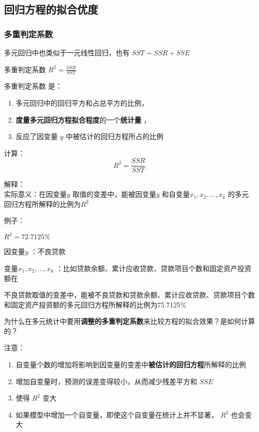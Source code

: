 \documentclass[UTF8,10pt]{book}
\begin{document}
\subsection{回归方程的拟合优度}\label{header-n171}

\subsubsection{多重判定系数 }\label{header-n172}

多元回归中也类似于一元线性回归，也有 \( SST = SSR + SSE \)

多重判定系数 \(R^2 = \frac{SSR}{SST} \)

多重判定系数 是：

\begin{enumerate}
	\def\labelenumi{\arabic{enumi}.}
	\item
	多元回归中的回归平方和占总平方的比例，
	\item
	\textbf{度量多元回归方程拟合程度}的一个\textbf{统计量} ，
	\item
	反应了因变量 \(y\) 中被估计的回归方程所占的比例
\end{enumerate}

计算：\\
\[ R^2 = \frac{SSR}{SST} \]

解释：\\
实际意义：在因变量\(y\) 取值的变差中，能被因变量\(y\)
和自变量\(x_1,x_2,...,x_k\) 的多元回归方程所解释的比例为\(R^2\)

例子：

\(R^2=72.7125\% \)

因变量\(y\) ：不良贷款

变量\(x_1,x_2,...,x_k\)
：比如贷款余额、累计应收贷款、贷款项目个数和固定资产投资额在

不良贷款取值的变差中，能被不良贷款和贷款余额、累计应收贷款、贷款项目个数和固定资产投资额的多元回归方程所解释的比例为75.7125\%

为什么在多元统计中要用\textbf{调整的多重判定系数}来比较方程的拟合效果？是如何计算的？

注意：

\begin{enumerate}
	\def\labelenumi{\arabic{enumi}.}
	\item
	自变量个数的增加将影响到因变量的变差中\textbf{被估计的回归方程}所解释的比例
	\item
	增加自变量时，预测的误差变得较小，从而减少残差平方和 \(SSE\) 
	\item
	使得 \(R^2\) 变大
	\item
	如果模型中增加一个自变量，即使这个自变量在统计上并不显著， \(R^2\)
	也会变大
\end{enumerate}
\end{document}

